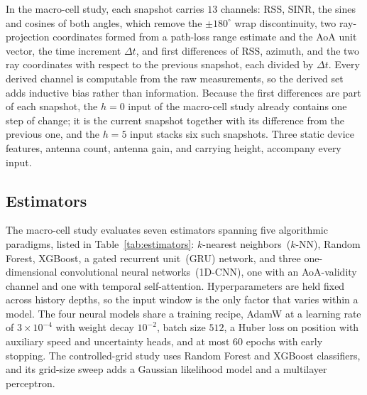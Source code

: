 In the macro-cell study, each snapshot carries $13$ channels: RSS, SINR, the sines and cosines of both angles, which remove the $\pm180^\circ$ wrap discontinuity, two ray-projection coordinates formed from a path-loss range estimate and the AoA unit vector, the time increment $\Delta t$, and first differences of RSS, azimuth, and the two ray coordinates with respect to the previous snapshot, each divided by $\Delta t$. Every derived channel is computable from the raw measurements, so the derived set adds inductive bias rather than information. Because the first differences are part of each snapshot, the $h=0$ input of the macro-cell study already contains one step of change; it is the current snapshot together with its difference from the previous one, and the $h=5$ input stacks six such snapshots. Three static device features, antenna count, antenna gain, and carrying height, accompany every input.

\subsection{Estimators}
\label{subsec:estimators}

The macro-cell study evaluates seven estimators spanning five algorithmic paradigms, listed in Table~\ref{tab:estimators}: $k$-nearest neighbors~($k$-NN), Random Forest, XGBoost, a gated recurrent unit~(GRU) network, and three one-dimensional convolutional neural networks~(1D-CNN), one with an AoA-validity channel and one with temporal self-attention. Hyperparameters are held fixed across history depths, so the input window is the only factor that varies within a model. The four neural models share a training recipe, AdamW at a learning rate of $3\times10^{-4}$ with weight decay $10^{-2}$, batch size $512$, a Huber loss on position with auxiliary speed and uncertainty heads, and at most $60$ epochs with early stopping. The controlled-grid study uses Random Forest and XGBoost classifiers, and its grid-size sweep adds a Gaussian likelihood model and a multilayer perceptron.


